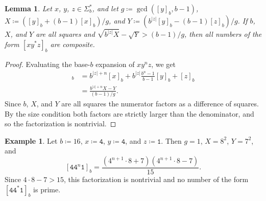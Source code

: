 \documentclass[12pt]{article}
\theoremstyle{plain}
\newtheorem{lemma}[theorem]{Lemma}
\theoremstyle{definition}
\newtheorem{example}[theorem]{Example}
\theoremstyle{remark}
\newcommand{\0}{\mathtt{0}}
\newcommand{\1}{\mathtt{1}}
\newcommand{\2}{\mathtt{2}}
\newcommand{\3}{\mathtt{3}}
\newcommand{\4}{\mathtt{4}}
\newcommand{\5}{\mathtt{5}}
\newcommand{\6}{\mathtt{6}}
\newcommand{\7}{\mathtt{7}}
\newcommand{\8}{\mathtt{8}}
\newcommand{\9}{\mathtt{9}}
\begin{document}
\begin{lemma}\label{lemsquares}
Let $x$, $y$, $z\in\Sigma^*_b$, and let $g\coloneqq\gcd([y]_b,b-1)$, 
$X\coloneqq([y]_b+(b-1)[x]_b)/g$, and $Y\coloneqq(b^{\lvert{z}\rvert}[y]_b-(b-1)[z]_b)/g$.
If\/ $b$, $X$, and $Y$ are all squares and 
$\sqrt{b^{\lvert z\rvert}X}-\sqrt{Y}>(b-1)/g$, then all numbers of the form
 $[xy^*z]_b$ are composite.
\end{lemma}
\begin{proof}
Evaluating the base-$b$ expansion of $xy^nz$, we get
\begin{align*}
[xy^nz]_b &= b^{\lvert z\rvert+n}[x]_b + b^{\lvert z\rvert}\frac{b^n-1}{b-1}[y]_b + [z]_b \\
&= \frac{b^{\lvert z\rvert+n}X-Y}{(b-1)/g} . 
\end{align*}
Since $b$, $X$, and $Y$ are all squares the numerator factors as a 
difference of squares.  By the size condition both factors are 
strictly larger than the
denominator, and so the factorization is nontrivial.
\end{proof}

\begin{example}
Let $b\coloneqq16$, $x\coloneqq\4$, $y\coloneqq\4$, and $z\coloneqq\1$.  Then $g=1$, $X=8^2$, $Y=7^2$, and
\[ [\4\4^n\1]_b = \frac{(4^{n+1}\cdot8+7)(4^{n+1}\cdot8-7)}{15} . \]
Since $4\cdot8-7>15$, this factorization is nontrivial and no number of 
the form $[\4\4^*\1]_b$ is prime.
\end{example}
\end{document}
